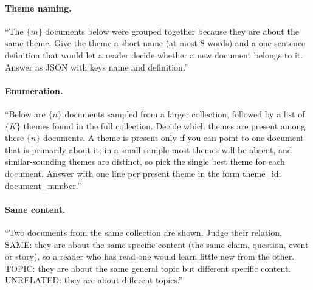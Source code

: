 \paragraph{Theme naming.} ``The $\{m\}$ documents below were grouped together because they are about the same theme. Give the theme a short name (at most 8 words) and a one-sentence definition that would let a reader decide whether a new document belongs to it. Answer as JSON with keys name and definition.''

\paragraph{Enumeration.} ``Below are $\{n\}$ documents sampled from a larger collection, followed by a list of $\{K\}$ themes found in the full collection. Decide which themes are present among these $\{n\}$ documents. A theme is present only if you can point to one document that is primarily about it; in a small sample most themes will be absent, and similar-sounding themes are distinct, so pick the single best theme for each document. Answer with one line per present theme in the form theme\_id: document\_number.''

\paragraph{Same content.} ``Two documents from the same collection are shown. Judge their relation. SAME: they are about the same specific content (the same claim, question, event or story), so a reader who has read one would learn little new from the other. TOPIC: they are about the same general topic but different specific content. UNRELATED: they are about different topics.''

